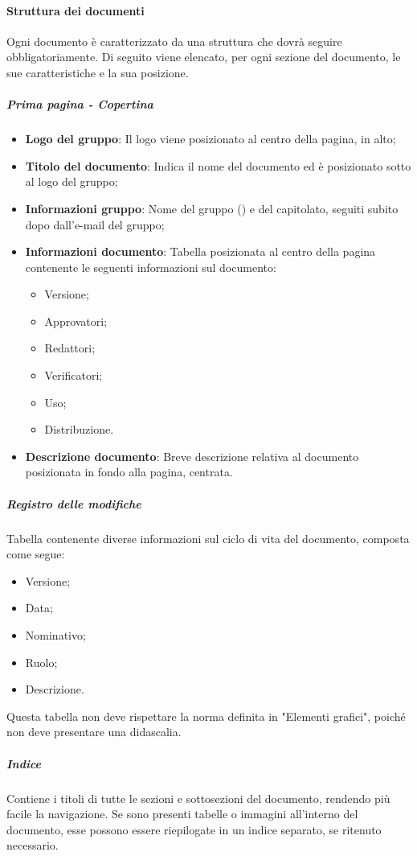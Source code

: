 \paragraph*{Struttura dei documenti}
Ogni documento è caratterizzato da una struttura che dovrà seguire obbligatoriamente.
Di seguito viene elencato, per ogni sezione del documento, le sue caratteristiche e la sua posizione.

\subparagraph*{Prima pagina - Copertina} 
\begin{itemize}
\item \textbf{Logo del gruppo}: Il logo viene posizionato al centro della pagina, in alto;
\item \textbf{Titolo del documento}: Indica il nome del documento ed è posizionato sotto al logo del gruppo;
\item \textbf{Informazioni gruppo}: Nome del gruppo (\Gruppo{}) e del capitolato, seguiti subito dopo dall'e-mail del gruppo; 
\item \textbf{Informazioni documento}: Tabella posizionata al centro della pagina contenente le seguenti informazioni sul documento:
\begin{itemize}
\item Versione;
\item Approvatori;
\item Redattori;
\item Verificatori;
\item Uso;
\item Distribuzione.
\end{itemize}
\item \textbf{Descrizione documento}: Breve descrizione relativa al documento posizionata in fondo alla pagina, centrata.
\end{itemize}
\subparagraph*{Registro delle modifiche}
Tabella contenente diverse informazioni sul ciclo di vita del documento, composta come segue:
\begin{itemize}
\item Versione;
\item Data;
\item Nominativo;
\item Ruolo;
\item Descrizione.
\end{itemize}
Questa tabella non deve rispettare la norma definita in "Elementi grafici", poiché non deve presentare una didascalia.

\subparagraph*{Indice}
Contiene i titoli di tutte le sezioni e sottosezioni del documento, rendendo più facile la navigazione.
Se sono presenti tabelle o immagini all'interno del documento, esse possono essere riepilogate in un indice separato, se ritenuto necessario.

